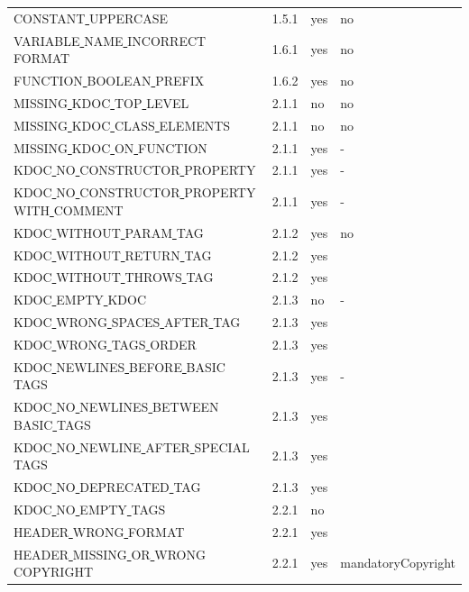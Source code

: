 \begin{center}
\begin{longtable}{ |l|p{0.8cm}|p{0.8cm}| p{3cm} | }
CONSTANT\underline{ }UPPERCASE & 1.5.1 &  yes  &  no \\
VARIABLE\underline{ }NAME\underline{ }INCORRECT\underline{ }FORMAT & 1.6.1 &  yes  &  no \\
FUNCTION\underline{ }BOOLEAN\underline{ }PREFIX & 1.6.2 &  yes  &  no \\
MISSING\underline{ }KDOC\underline{ }TOP\underline{ }LEVEL & 2.1.1 &  no  &  no \\
MISSING\underline{ }KDOC\underline{ }CLASS\underline{ }ELEMENTS & 2.1.1 &  no  &  no \\
MISSING\underline{ }KDOC\underline{ }ON\underline{ }FUNCTION & 2.1.1 &  yes  &  - \\
KDOC\underline{ }NO\underline{ }CONSTRUCTOR\underline{ }PROPERTY & 2.1.1 &  yes  &  -\\
KDOC\underline{ }NO\underline{ }CONSTRUCTOR\underline{ }PROPERTY\underline{ }WITH\underline{ }COMMENT & 2.1.1 &  yes  &  -\\
KDOC\underline{ }WITHOUT\underline{ }PARAM\underline{ }TAG & 2.1.2 &  yes  &  no \\
KDOC\underline{ }WITHOUT\underline{ }RETURN\underline{ }TAG & 2.1.2 &  yes  &   \\
KDOC\underline{ }WITHOUT\underline{ }THROWS\underline{ }TAG & 2.1.2 &  yes  &   \\
KDOC\underline{ }EMPTY\underline{ }KDOC & 2.1.3 &  no  &  - \\
KDOC\underline{ }WRONG\underline{ }SPACES\underline{ }AFTER\underline{ }TAG & 2.1.3 &  yes  &   \\
KDOC\underline{ }WRONG\underline{ }TAGS\underline{ }ORDER & 2.1.3 &  yes  &   \\
KDOC\underline{ }NEWLINES\underline{ }BEFORE\underline{ }BASIC\underline{ }TAGS & 2.1.3 &  yes  &  - \\
KDOC\underline{ }NO\underline{ }NEWLINES\underline{ }BETWEEN\underline{ }BASIC\underline{ }TAGS & 2.1.3 &  yes  &   \\
KDOC\underline{ }NO\underline{ }NEWLINE\underline{ }AFTER\underline{ }SPECIAL\underline{ }TAGS & 2.1.3 &  yes  &   \\
KDOC\underline{ }NO\underline{ }DEPRECATED\underline{ }TAG & 2.1.3 &  yes  &   \\
KDOC\underline{ }NO\underline{ }EMPTY\underline{ }TAGS & 2.2.1 &  no  &   \\
HEADER\underline{ }WRONG\underline{ }FORMAT & 2.2.1 &  yes  &   \\
HEADER\underline{ }MISSING\underline{ }OR\underline{ }WRONG\underline{ }COPYRIGHT & 2.2.1 &  yes  & mandatoryCopyright\\

\end{longtable}
\end{center}
